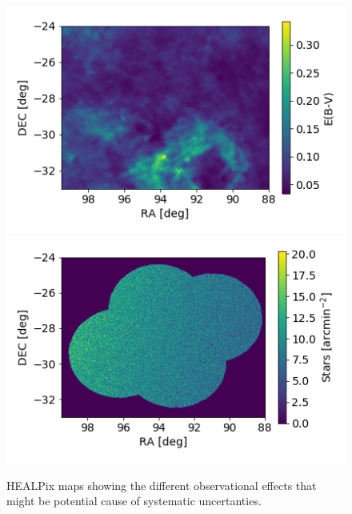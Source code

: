 \documentclass[\docopts]{\docclass}
\begin{document}
\begin{figure}
\centering
\includegraphics[width=0.7\columnwidth]{extinction.png}
\includegraphics[width=0.7\columnwidth]{stellar_density.png}
\caption{HEALPix maps showing the different observational effects that might be potential cause of systematic uncertanties.}
\label{fig:systematic_maps2}
\end{figure}
\end{document}
